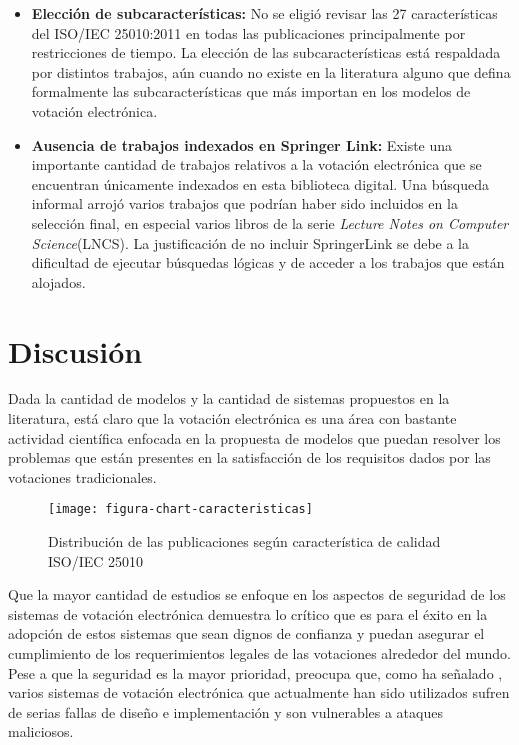 \begin{itemize}
	\item \textbf{Elección de subcaracterísticas:} No se eligió revisar las 27 
	características del ISO/IEC 25010:2011 en todas las publicaciones principalmente
	por restricciones de tiempo. La elección de las subcaracterísticas está 
	respaldada por distintos trabajos, aún cuando no existe en la literatura alguno
	que defina formalmente las subcaracterísticas que más importan en los 
	modelos de votación electrónica.
	
	\item \textbf{Ausencia de trabajos indexados en Springer Link:} Existe una
	importante cantidad de trabajos relativos a la votación electrónica que se encuentran
	únicamente indexados en esta biblioteca digital. Una búsqueda informal arrojó
	varios trabajos que podrían haber sido incluidos en la selección final, en especial
	varios libros de la serie \textit{Lecture Notes on Computer Science}(LNCS). La justificación
	de no incluir SpringerLink se debe a la dificultad de ejecutar búsquedas lógicas
	y de acceder a los trabajos que están alojados. 
	
\end{itemize} 

\section{Discusión}

Dada la cantidad de modelos y la cantidad de sistemas propuestos en la
literatura, está claro que la votación electrónica es una área con bastante
actividad científica enfocada en la propuesta de modelos que puedan resolver
los problemas que están presentes en la satisfacción de los requisitos
dados por las votaciones tradicionales. 

\begin{figure}[h!]
	\centering
	\texttt{[image: figura-chart-caracteristicas]}
	\caption{Distribución de las publicaciones según característica de calidad ISO/IEC 25010}
	\label{fig:chart-caracteristicas}
\end{figure}
\bigskip

Que la mayor cantidad de estudios se enfoque en los aspectos de seguridad
de los sistemas de votación electrónica demuestra lo crítico que es para el
éxito en la adopción de estos sistemas que sean dignos de confianza y puedan
asegurar el cumplimiento de los requerimientos legales de las votaciones 
alrededor del mundo. Pese a que la seguridad es la mayor prioridad, preocupa
que, como ha señalado \cite{Al-Shammari2012}, varios sistemas de votación 
electrónica que actualmente han sido utilizados sufren de serias fallas de diseño
e implementación y son vulnerables a ataques maliciosos. 


